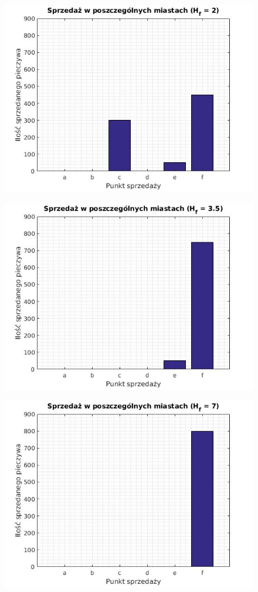 \documentclass[]{article}
\begin{document}
\begin{figure}
	\centering
	\caption{}
	\includegraphics[width=0.7\linewidth]{Hf_2_0}
	\label{fig:Hf_2_0}
\end{figure}

\begin{figure}
	\centering
	\caption{}
	\includegraphics[width=0.7\linewidth]{Hf_3_5}
	\label{fig:Hf_3_5}
\end{figure}

\begin{figure}
	\centering
	\caption{}
	\includegraphics[width=0.7\linewidth]{Hf_7_0}
	\label{fig:Hf_7_0}
\end{figure}
\end{document}
